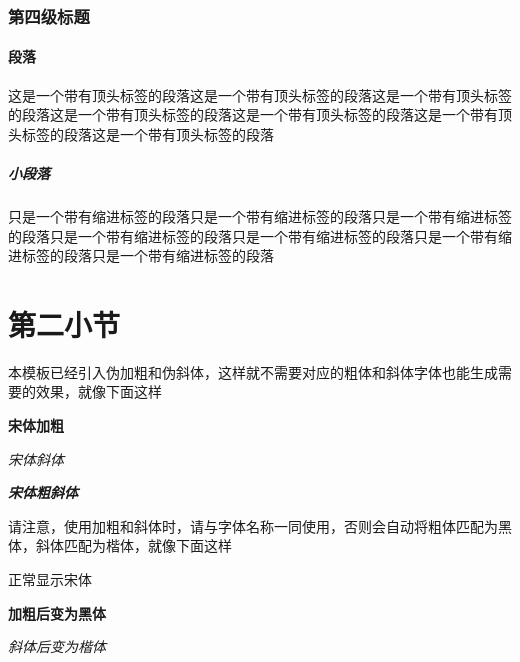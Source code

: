 \documentclass{CustGraduPaper}
\begin{document}
\subsubsection{第四级标题}

\paragraph{段落}\label{para:para}这是一个带有顶头标签的段落这是一个带有顶头标签的段落这是一个带有顶头标签的段落这是一个带有顶头标签的段落这是一个带有顶头标签的段落这是一个带有顶头标签的段落这是一个带有顶头标签的段落
\subparagraph{小段落}\label{subpara:subpara}只是一个带有缩进标签的段落只是一个带有缩进标签的段落只是一个带有缩进标签的段落只是一个带有缩进标签的段落只是一个带有缩进标签的段落只是一个带有缩进标签的段落只是一个带有缩进标签的段落
\section{第二小节}
本模板已经引入伪加粗和伪斜体，这样就不需要对应的粗体和斜体字体也能生成需要的效果，就像下面这样

{\songti \bfseries 宋体加粗}

{\songti \itshape 宋体斜体}

{\songti \bfseries \itshape 宋体粗斜体}

请注意，使用加粗和斜体时，请与字体名称一同使用，否则会自动将粗体匹配为黑体，斜体匹配为楷体，就像下面这样

{正常显示宋体}

{\bfseries 加粗后变为黑体}

{\itshape 斜体后变为楷体}
\end{document}
